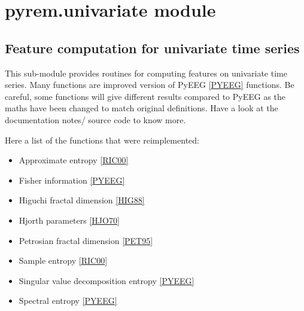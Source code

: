 \documentclass[letterpaper,10pt,english]{sphinxmanual}
\begin{document}
\section{pyrem.univariate module}
\label{pyrem.univariate:pyrem-univariate-module}\label{pyrem.univariate::doc}\label{pyrem.univariate:module-pyrem.univariate}

\subsection{Feature computation for univariate time series}
\label{pyrem.univariate:feature-computation-for-univariate-time-series}
This sub-module provides routines for computing features on univariate time series.
Many functions are improved version of PyEEG {\hyperref[pyrem.univariate:pyeeg]{{[}PYEEG{]}}} functions. Be careful,
some functions will give different results compared to PyEEG as the maths have been changed to match original definitions.
Have a look at the documentation notes/ source code to know more.

Here a list of the functions that were reimplemented:
\begin{itemize}
\item {} 
Approximate entropy {\hyperref[pyrem.univariate:pyrem.univariate.ap_entropy]{}} {\hyperref[pyrem.univariate:ric00]{{[}RIC00{]}}}

\item {} 
Fisher information {\hyperref[pyrem.univariate:pyrem.univariate.fisher_info]{}} {\hyperref[pyrem.univariate:pyeeg]{{[}PYEEG{]}}}

\item {} 
Higuchi fractal dimension  {\hyperref[pyrem.univariate:pyrem.univariate.hfd]{}} {\hyperref[pyrem.univariate:hig88]{{[}HIG88{]}}}

\item {} 
Hjorth parameters {\hyperref[pyrem.univariate:pyrem.univariate.hjorth]{}} {\hyperref[pyrem.univariate:hjo70]{{[}HJO70{]}}}

\item {} 
Petrosian fractal dimension {\hyperref[pyrem.univariate:pyrem.univariate.pfd]{}} {\hyperref[pyrem.univariate:pet95]{{[}PET95{]}}}

\item {} 
Sample entropy {\hyperref[pyrem.univariate:pyrem.univariate.samp_entropy]{}} {\hyperref[pyrem.univariate:ric00]{{[}RIC00{]}}}

\item {} 
Singular value decomposition entropy {\hyperref[pyrem.univariate:pyrem.univariate.svd_entropy]{}} {\hyperref[pyrem.univariate:pyeeg]{{[}PYEEG{]}}}

\item {} 
Spectral entropy {\hyperref[pyrem.univariate:pyrem.univariate.spectral_entropy]{}} {\hyperref[pyrem.univariate:pyeeg]{{[}PYEEG{]}}}

\end{itemize}
\end{document}
